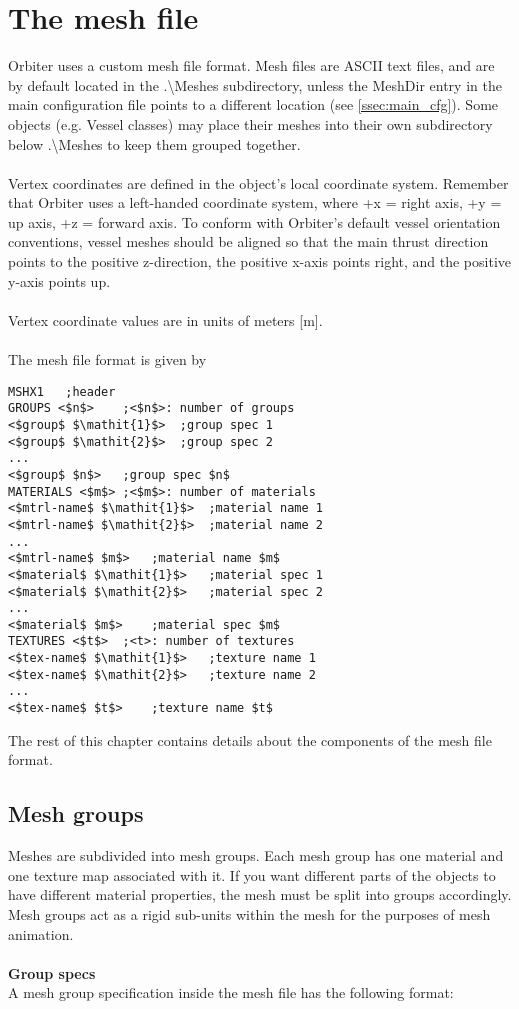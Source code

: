 \documentclass[Orbiter Developer Manual.tex]{subfiles}
\begin{document}
\section{The mesh file}
\label{sec:mesh_file}
Orbiter uses a custom mesh file format. Mesh files are ASCII text files, and are by default located in the .\textbackslash Meshes subdirectory, unless the MeshDir entry in the main configuration file points to a different location (see \ref{ssec:main_cfg}). Some objects (e.g. Vessel classes) may place their meshes into their own subdirectory below .\textbackslash Meshes to keep them grouped together.\\
\\
Vertex coordinates are defined in the object's local coordinate system. Remember that Orbiter uses a left-handed coordinate system, where +x = right axis, +y = up axis, +z = forward axis. To conform with Orbiter's default vessel orientation conventions, vessel meshes should be aligned so that the main thrust direction points to the positive z-direction, the positive x-axis points right, and the positive y-axis points up.\\
\\
Vertex coordinate values are in units of meters [m].\\
\\
The mesh file format is given by

\begin{lstlisting}[language=OSFS,mathescape=true]
MSHX1	;header
GROUPS <$n$>	;<$n$>: number of groups
<$group$ $\mathit{1}$>	;group spec 1
<$group$ $\mathit{2}$>	;group spec 2
...
<$group$ $n$>	;group spec $n$
MATERIALS <$m$>	;<$m$>: number of materials
<$mtrl-name$ $\mathit{1}$>	;material name 1
<$mtrl-name$ $\mathit{2}$>	;material name 2
...
<$mtrl-name$ $m$>	;material name $m$
<$material$ $\mathit{1}$>	;material spec 1
<$material$ $\mathit{2}$>	;material spec 2
...
<$material$ $m$>	;material spec $m$
TEXTURES <$t$>	;<t>: number of textures
<$tex-name$ $\mathit{1}$>	;texture name 1
<$tex-name$ $\mathit{2}$>	;texture name 2
...
<$tex-name$ $t$>	;texture name $t$
\end{lstlisting}

\noindent
The rest of this chapter contains details about the components of the mesh file format.


\subsection{Mesh groups}
Meshes are subdivided into mesh groups. Each mesh group has one material and one texture map associated with it. If you want different parts of the objects to have different material properties, the mesh must be split into groups accordingly. Mesh groups act as a rigid sub-units within the mesh for the purposes of mesh animation.\\
\\
\textbf{Group specs}\\
A mesh group specification inside the mesh file has the following format:
\end{document}
